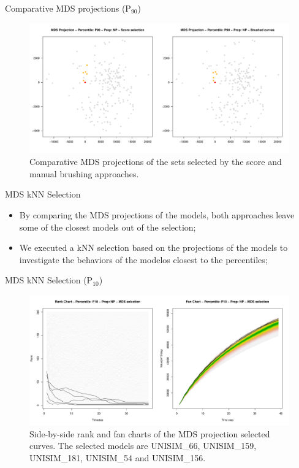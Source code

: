 \documentclass{beamer}
\begin{document}
\begin{frame}{Comparative MDS projections (P$_{90}$)}
  \begin{figure}[H]
    \centering
    \includegraphics[width=\columnwidth]{figures/mds-brush-score-p90.pdf}
    \caption{Comparative MDS projections of the sets selected by the score and manual brushing approaches.}
    \label{fig:mds-plots}
  \end{figure}
\end{frame}

\begin{frame}{MDS kNN Selection}
  \begin{itemize}
    \item By comparing the MDS projections of the models, both approaches leave some of the closest models out of the selection;
    \item We executed a kNN selection based on the projections of the models to investigate the behaviors of the modelos closest to the percentiles;
  \end{itemize}
\end{frame}

\begin{frame}{MDS kNN Selection (P$_{10}$)}
  \begin{figure}[H]
    \centering
    \includegraphics[width=\columnwidth]{rank-fan-mds-sel-p10.pdf}
    \caption{Side-by-side rank and fan charts of the MDS projection selected curves. The selected models are UNISIM\_66, UNISIM\_159, UNISIM\_181, UNISIM\_54 and UNISIM\_156.}
    \label{fig:rank-fan-mds}
  \end{figure}
\end{frame}
\end{document}
